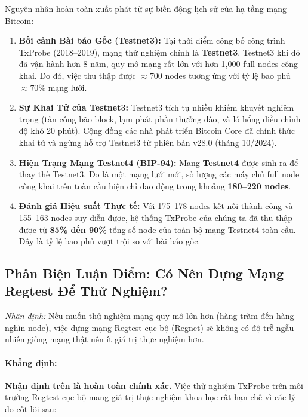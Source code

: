 \documentclass[11pt,a4paper]{article}
\begin{document}
Nguyên nhân hoàn toàn xuất phát từ sự biến động lịch sử của hạ tầng mạng Bitcoin:
\begin{enumerate}
    \item \textbf{Bối cảnh Bài báo Gốc (Testnet3):} Tại thời điểm công bố công trình TxProbe (2018--2019), mạng thử nghiệm chính là \textbf{Testnet3}. Testnet3 khi đó đã vận hành hơn 8 năm, quy mô mạng rất lớn với hơn 1,000 full nodes công khai. Do đó, việc thu thập được $\approx 700$ nodes tương ứng với tỷ lệ bao phủ $\approx 70\%$ mạng lưới.
    \item \textbf{Sự Khai Tử của Testnet3:} Testnet3 tích tụ nhiều khiếm khuyết nghiêm trọng (tấn công bão block, lạm phát phần thưởng đào, và lỗ hổng điều chỉnh độ khó 20 phút). Cộng đồng các nhà phát triển Bitcoin Core đã chính thức khai tử và ngừng hỗ trợ Testnet3 từ phiên bản v28.0 (tháng 10/2024).
    \item \textbf{Hiện Trạng Mạng Testnet4 (BIP-94):} Mạng \textbf{Testnet4} được sinh ra để thay thế Testnet3. Do là một mạng lưới mới, số lượng các máy chủ full node công khai trên toàn cầu hiện chỉ dao động trong khoảng \textbf{180--220 nodes}.
    \item \textbf{Đánh giá Hiệu suất Thực tế:} Với 175--178 nodes kết nối thành công và 155--163 nodes suy diễn được, hệ thống TxProbe của chúng ta đã thu thập được từ \textbf{85\% đến 90\%} tổng số node của toàn bộ mạng Testnet4 toàn cầu. Đây là tỷ lệ bao phủ vượt trội so với bài báo gốc.
\end{enumerate}

\subsection{Phản Biện Luận Điểm: Có Nên Dựng Mạng Regtest Để Thử Nghiệm?}
\textit{Nhận định:} Nếu muốn thử nghiệm mạng quy mô lớn hơn (hàng trăm đến hàng nghìn node), việc dựng mạng Regtest cục bộ (Regnet) sẽ không có độ trễ ngẫu nhiên giống mạng thật nên ít giá trị thực nghiệm hơn.

\paragraph{Khẳng định:} \textbf{Nhận định trên là hoàn toàn chính xác.} Việc thử nghiệm TxProbe trên môi trường Regtest cục bộ mang giá trị thực nghiệm khoa học rất hạn chế vì các lý do cốt lõi sau:
\end{document}
